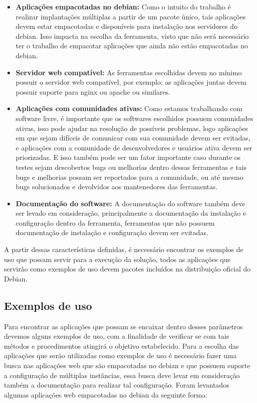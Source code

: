 \begin{itemize}
  \item  \textbf{Aplicações empacotadas no debian:} Como o intuito do trabalho
  é realizar implantações múltiplas a partir de um pacote único, tais aplicações
  devem estar empacotadas e disponíveis para instalação nos servidores do debian.
  Isso impacta na escolha da ferramenta, visto que não será necessário ter o trabalho
  de empacotar aplicações que ainda não estão empacotadas no debian.
  \item  \textbf{Servidor web compatível:} As ferramentas escolhidas devem no
  mínimo possuir o servidor web compatível, por exemplo: as aplicações juntas
  devem possuir suporte para nginx ou apache ou similares.
  \item  \textbf{Aplicações com comunidades ativas:} Como estamos trabalhando
  com software livre, é importante que os softwares escolhidos possuem comunidades
  ativas, isso pode ajudar na resolução de possíveis problemas, logo aplicações
  em que sejam difíceis de comunicar com sua comunidade devem ser evitadas, e
  aplicações com a comunidade de desenvolvedores e usuários ativa devem ser priorizadas.
  E isso também pode ser um fator importante caso durante os testes sejam descobertos
  bugs ou melhorias dentro dessas ferramentas e tais bugs e melhorias possam ser
  reportados para a comunidade, ou até mesmo bugs solucionados e devolvidos aos mantenedores
  das ferramentas.
  \item  \textbf{Documentação do software:} A documentação do software também deve
  ser levado em consideração, principalmente a documentação da instalação e configuração
  dentro da ferramenta, ferramentas que não possuem documentação de instalação e
  configuração devem ser evitadas.
\end{itemize}

A partir dessas características definidas, é necessário encontrar os exemplos de uso
que possam servir para a execução da solução, todos as aplicações que servirão como
exemplos de uso devem pacotes incluídos na distribuição oficial do Debian.

\subsection{Exemplos de uso}
\label{subsection:exemplos}

Para encontrar as aplicações que possam se encaixar dentro desses parâmetros devemos
alguns exemplos de uso, com a finalidade de verificar se com tais métodos e
procedimentos atingirá o objetivo estabelecido. Para a escolha das aplicações que
serão utilizadas como exemplos de uso é necessário fazer uma busca nas aplicações
web que são empacotadas no debian e que possuem suporte a configuração de múltiplas
instâncias, essa busca deve levar em consideração também a documentação para realizar
tal configuração. Foram levantados algumas aplicações web empacotadas no debian da
seguinte forma:

